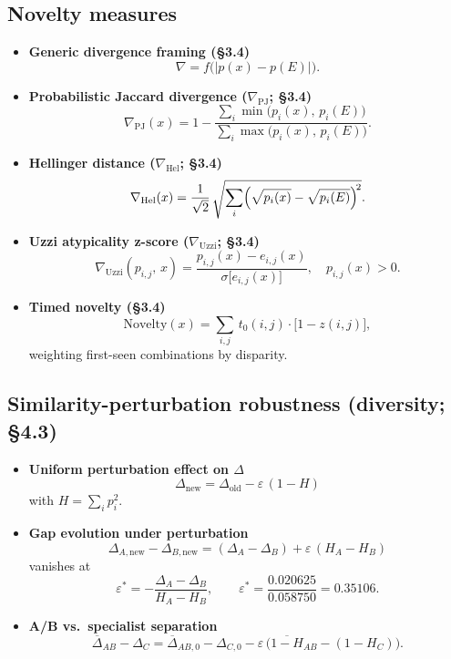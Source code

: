 \documentclass[
  10pt,
  twocolumn,
]{article}
\begin{document}
\hypertarget{novelty-measures}{%
\subsection{Novelty measures}\label{novelty-measures}}

\begin{itemize}
\item
  \textbf{Generic divergence framing (§3.4)}\\
  \[ \nabla = f\!\bigl(\lvert p(x) - p(E) \rvert\bigr). \]
\item
  \textbf{Probabilistic Jaccard divergence (\(\nabla_{\mathrm{PJ}}\);
  §3.4)}\\
  \[ \nabla_{\mathrm{PJ}}(x) = 1 - \frac{\sum_i \min\!\bigl(p_i(x),\, p_i(E)\bigr)}{\sum_i \max\!\bigl(p_i(x),\, p_i(E)\bigr)}. \]
\item
  \textbf{Hellinger distance (\(\nabla_{\mathrm{Hel}}\); §3.4)}\\
  \[ \nabla_{\mathrm{Hel}}(x) = \frac{1}{\sqrt{2}}\,\sqrt{\sum_i \Bigl( \sqrt{p_i(x)} - \sqrt{p_i(E)}\Bigr)^{\!2}}. \]
\item
  \textbf{Uzzi atypicality z-score (\(\nabla_{\mathrm{Uzzi}}\); §3.4)}\\
  \[ \nabla_{\mathrm{Uzzi}}(p_{i,j},\, x) = \frac{p_{i,j}(x) - e_{i,j}(x)}{\sigma\!\bigl[e_{i,j}(x)\bigr]}, \quad p_{i,j}(x) > 0. \]
\item
  \textbf{Timed novelty (§3.4)}\\
  \[ \mathrm{Novelty}(x) = \sum_{i,j}\, t_0(i,j) \cdot \bigl[1 - z(i,j) \bigr], \]
  weighting first-seen combinations by disparity.
\end{itemize}

\hypertarget{similarity-perturbation-robustness-diversity-4.3}{%
\subsection{Similarity-perturbation robustness (diversity;
§4.3)}\label{similarity-perturbation-robustness-diversity-4.3}}

\begin{itemize}
\item
  \textbf{Uniform perturbation effect on \(\Delta\)}\\
  \[ \Delta_{\text{new}} = \Delta_{\text{old}} - \varepsilon\,(1 - H) \]
  with \(H = \sum_i p_i^2\).
\item
  \textbf{Gap evolution under perturbation}\\
  \[ \Delta_{A,\text{new}} - \Delta_{B,\text{new}} = (\Delta_A - \Delta_B) + \varepsilon\,(H_A - H_B) \]
  vanishes at
  \[ \varepsilon^* = -\frac{\Delta_A - \Delta_B}{H_A - H_B}, \qquad \varepsilon^* = \frac{0.020625}{0.058750} = 0.35106. \]
\item
  \textbf{A/B vs.~specialist separation}\\
  \[ \overline{\Delta}_{AB} - \Delta_C = \overline{\Delta}_{AB,0} - \Delta_{C,0} - \varepsilon\,\bigl(\overline{1-H}_{AB} - (1-H_C)\bigr). \]
\end{itemize}
\end{document}
